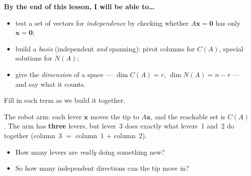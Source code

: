 \documentclass[10pt]{article}
\newcommand{\xx}{\mathbf{x}}
\newcommand{\zero}{\mathbf{0}}
\begin{document}
\namedateperiod

\vspace{0.06in}

\begin{objectivebox}
\textbf{By the end of this lesson, I will be able to\dots}
\begin{itemize}\setlength{\itemsep}{1pt}
  \item test a set of vectors for \emph{independence} by checking whether $A\xx=\zero$ has only $\xx=\zero$;
  \item build a \emph{basis} (independent \emph{and} spanning): pivot columns for $C(A)$, special solutions for $N(A)$;
  \item give the \emph{dimension} of a space --- $\dim C(A)=r$, $\dim N(A)=n-r$ --- and say what it counts.
\end{itemize}
\end{objectivebox}

\vspace{0.04in}

\begin{vocabbox}
\small
Fill in each term as we build it together.
\vspace{2pt}
\end{vocabbox}

\begin{hookbox}
The robot arm: each lever $\xx$ moves the tip to $A\xx$, and the reachable set is $C(A)$. The arm has
\textbf{three} levers, but lever~3 does exactly what levers~1 and~2 do together (column~3 $=$ column~1 $+$
column~2).
\begin{itemize}\setlength{\itemsep}{1pt}
  \item How many levers are \emph{really} doing something new? \writeline
  \item So how many independent directions can the tip move in? \writeline
\end{itemize}
\end{hookbox}
\end{document}
